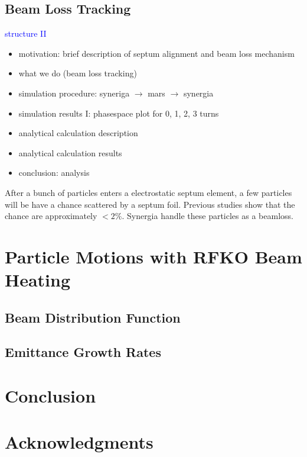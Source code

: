 \documentclass[aps,prstab,onecolumn,preprint,endfloats,11pt]{revtex4-1}
\begin{document}
\clearpage
\subsection{\label{sec:beamloss}Beam Loss Tracking}

\textcolor{blue}{structure II}
\begin{itemize}
  \item motivation: brief description of septum alignment and beam loss mechanism
  \item what we do (beam loss tracking)
  \item simulation procedure: syneriga $\rightarrow$ mars $\rightarrow$ synergia
  \item simulation results I: phasespace plot for 0, 1, 2, 3 turns
  \item analytical calculation description
  \item analytical calculation results
  \item conclusion: analysis
\end{itemize}


After a bunch of particles enters a electrostatic septum element, a few particles will be have a chance scattered by a septum foil.
Previous studies show that the chance are approximately $< 2 \%$. Synergia handle these particles as a beamloss. 




\clearpage
\section{\label{sec:rfko}Particle Motions with RFKO Beam Heating}

\subsection{\label{sec:dist}Beam Distribution Function}

\subsection{\label{sec:emit}Emittance Growth Rates}

\section{\label{sec:conclusion}Conclusion}

\section{\label{thanks}Acknowledgments}
\end{document}
